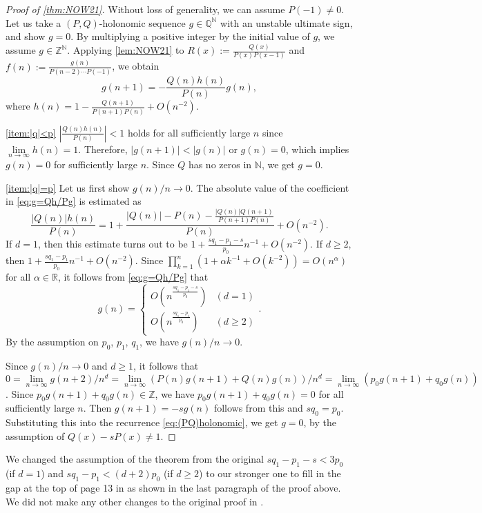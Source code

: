 \documentclass[a4paper,UKenglish,cleveref,autoref,thm-restate]{lipics-v2021}
\newcommand{\R}{\mathbb{R}}
\newcommand{\N}{\mathbb{N}}
\newcommand{\Q}{\mathbb{Q}}
\newcommand{\Z}{\mathbb{Z}}
\begin{document}
\begin{proof}[Proof of \cref{thm:NOW21}]
Without loss of generality, we can assume $P(-1) \neq 0$. Let us take a $(P, Q)$-holonomic sequence $g \in \Q^{\N}$ with an unstable ultimate sign, and show $g=0$. By multiplying a positive integer by the initial value of $g$, we assume $g \in \Z^{\N}$. Applying \cref{lem:NOW21} to $R(x) := \frac{Q(x)}{P(x)P(x-1)}$ and $f(n) := \frac{g(n)}{P(n-2) \dotsm P(-1)}$, we obtain
\begin{equation}\label{eq:g=Qh/Pg}
g(n+1) = - \frac{Q(n)h(n)}{P(n)} g(n), 
\end{equation}
where $h(n) = 1-\frac{Q(n+1)}{P(n+1)P(n)} + O(n^{-2})$.

\eqref{item:|q|<p} $\left| \frac{Q(n)h(n)}{P(n)} \right| < 1$ holds for all sufficiently large $n$ since $\lim\limits_{n \to \infty} h(n) = 1$. Therefore, $|g(n+1)| < |g(n)|$ or $g(n) = 0$, which implies $g(n) = 0$ for sufficiently large $n$. Since $Q$ has no zeros in $\N$, we get $g=0$. 

\eqref{item:|q|=p} Let us first show $g(n) / n \to 0$. The absolute value of the coefficient in \eqref{eq:g=Qh/Pg} is estimated as
\[
\frac{|Q(n)|h(n)}{P(n)} = 1 + \frac{|Q(n)| - P(n) - \tfrac{|Q(n)|Q(n+1)}{P(n+1)P(n)}}{P(n)} + O(n^{-2}). 
\]
If $d=1$, then this estimate turns out to be $1 + \frac{sq_1-p_1-s}{p_0}n^{-1} + O(n^{-2})$. 
If $d \geq 2$, then $1 + \frac{sq_1-p_1}{p_0}n^{-1} + O(n^{-2})$. Since $\prod_{k=1}^n \left( 1 + \alpha k^{-1} + O(k^{-2}) \right) = O(n^{\alpha})$ for all $\alpha \in \R$, it follows from \eqref{eq:g=Qh/Pg} that
\[
g(n) = 
\begin{cases}
O\left( n^{\frac{sq_1-p_1-s}{p_0}} \right) & (d = 1) \\
O\left( n^{\frac{sq_1-p_1}{p_0}} \right) & (d \geq 2)
\end{cases}.
\]
By the assumption on $p_0$, $p_1$, $q_1$, we have $g(n) / n \to 0$. 

Since $g(n) / n \to 0$ and $d \geq 1$, it follows that $0 = \lim\limits_{n \to \infty} g(n+2) / n^d = \lim\limits_{n \to \infty} (P(n)g(n+1) + Q(n)g(n)) / n^d = \lim\limits_{n \to \infty} (p_0g(n+1) + q_0g(n))$. Since $p_0 g(n+1) + q_0 g(n) \in \Z$, we have $p_0 g(n+1) + q_0 g(n) = 0$ for all sufficiently large $n$. Then $g(n+1) = -sg(n)$ follows from this and $sq_0 = p_0$. Substituting this into the recurrence \eqref{eq:(PQ)holonomic}, we get $g=0$, by the assumption of $Q(x)-sP(x) \neq 1$. 
\end{proof}

We changed the assumption of the theorem from the original $s q_1 - p_1 - s < 3 p_0$ (if $d = 1$) and $s q_1 - p_1 < (d+2) p_0$ (if $d \geq 2$) to our stronger one to fill in the gap at the top of page 13 in \cite{NOW21} as shown in the last paragraph of the proof above.
We did not make any other changes to the original proof in \cite[\S~3.3]{NOW21}.












\end{document}
